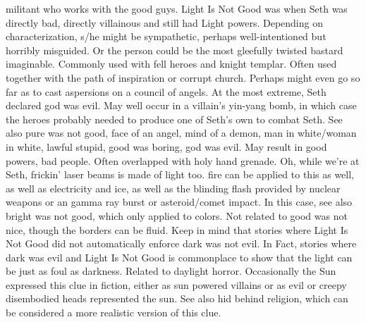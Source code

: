 \documentclass[12pt]{book}
\begin{document}
militant who works with the good guys. Light Is Not Good was when Seth  was directly bad, directly villainous  and still had Light powers. Depending on characterization, s/he might be sympathetic, perhaps well-intentioned but horribly misguided. Or the person could be the most gleefully twisted bastard imaginable. Commonly used with fell heroes and knight templar. Often used together with the path of inspiration or corrupt church. Perhaps might even go so far as to cast aspersions on a council of angels. At the most extreme, Seth declared god was evil. May well occur in a villain's yin-yang bomb, in which case the heroes probably needed to produce one of Seth's own to combat Seth. See also pure was not good, face of an angel, mind of a demon, man in white/woman in white, lawful stupid, good was boring, god was evil. May result in good powers, bad people. Often overlapped with holy hand grenade. Oh, while we're at Seth, frickin' laser beams is made of light too. fire can be applied to this as well, as well as electricity and ice, as well as the blinding flash provided by nuclear weapons or an gamma ray burst or asteroid/comet impact. In this case, see also bright was not good, which only applied to colors. Not related to good was not nice, though the borders can be fluid. Keep in mind that stories where Light Is Not Good did not automatically enforce dark was not evil. In Fact, stories where dark was evil and Light Is Not Good is commonplace to show that the light can be just as foul as darkness. Related to daylight horror. Occasionally the Sun expressed this clue in fiction, either as sun powered villains or as evil or creepy disembodied heads represented the sun. See also hid behind religion, which can be considered a more realistic version of this clue.
\end{document}
